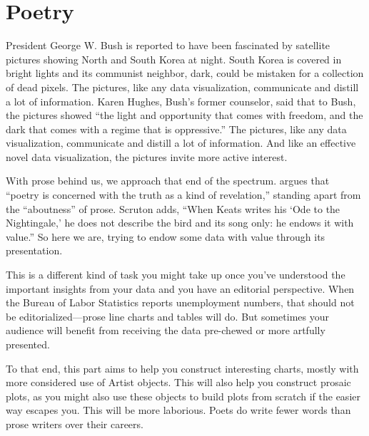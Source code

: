 \chapter{Poetry}
President George W. Bush is reported to have been fascinated by satellite pictures showing North and South Korea at night. South Korea is covered in bright lights and its communist neighbor, dark, could be mistaken for a collection of dead pixels. The pictures, like any data visualization, communicate and distill a lot of information. Karen Hughes, Bush's former counselor, said that to Bush, the pictures showed ``the light and opportunity that comes with freedom, and the dark that comes with a regime that is oppressive.''  The pictures, like any data visualization, communicate and distill a lot of information. And like an effective novel data visualization, the pictures invite more active interest. 

With prose behind us, we approach that end of the spectrum.  \cite{scruton2015poetry} argues that ``poetry is concerned with the truth as a kind of revelation,'' standing apart from the ``aboutness'' of prose. Scruton adds, ``When Keats writes his `Ode to the Nightingale,' he does not describe the bird and its song only: he endows it with value.'' So here we are, trying to endow some data with value through its presentation. 

This is a different kind of task you might take up once you've understood the important insights from your data and you have an editorial perspective. When the Bureau of Labor Statistics reports unemployment numbers, that should not be editorialized---prose line charts and tables will do. But sometimes your audience will benefit from receiving the data pre-chewed or more artfully presented. %

To that end, this part aims to help you construct interesting charts, mostly with more considered use of Artist objects. This will also help you construct prosaic plots, as you might also use these objects to build plots from scratch if the easier way escapes you. This will be more laborious. Poets do write fewer words than prose writers over their careers. 


